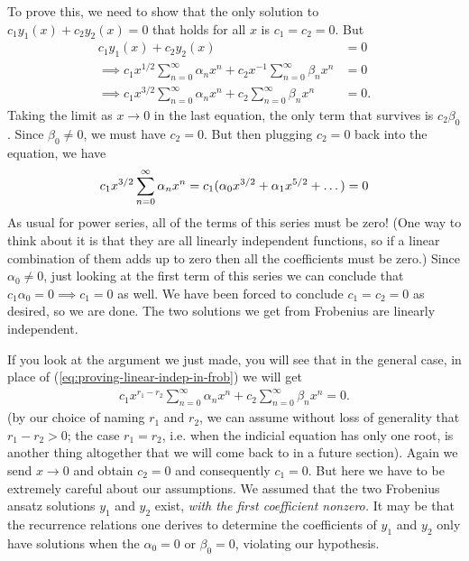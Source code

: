 \documentclass[11pt, letterpaper, oneside]{article}     %
\numberwithin{equation}{subsection}
\theoremstyle{definition}
\numberwithin{theorem}{section}
\theoremstyle{remark}
\begin{document}
\begin{enumerate}
  To prove this, we need to show that the only solution to $c_1y_1(x) + c_2y_2(x) = 0$ that holds for all $x$ is $c_1 = c_2 = 0$. But
  \begin{align}
    c_1 y_1(x) + c_2y_2(x) &= 0\\
    \implies c_1x^{1/2}\sum_{n=0}^\infty\alpha_nx^n + c_2x^{-1}\sum_{n=0}^\infty\beta_nx^n &= 0\\
    \implies c_1x^{3/2}\sum_{n=0}^\infty\alpha_nx^n + c_2\sum_{n=0}^\infty\beta_nx^n &= 0.\label{eq:proving-linear-indep-in-frob}
  \end{align}
  Taking the limit as $x\to 0$ in the last equation, the only term that survives is $c_2\beta_0$. Since $\beta_0 \neq 0$, we must have $c_2 = 0$. But then plugging $c_2 = 0$ back into the equation, we have
  \begin{equation}\\
    c_1x^{3/2}\sum_{n=0}^\infty\alpha_nx^n = c_1(\alpha_0x^{3/2} + \alpha_1x^{5/2} + \dots) = 0
  \end{equation}
  As usual for power series, all of the terms of this series must be zero! (One way to think about it is that they are all linearly independent functions, so if a linear combination of them adds up to zero then all the coefficients must be zero.) Since $\alpha_0 \neq 0$, just looking at the first term of this series we can conclude that $c_1\alpha_0 = 0\implies c_1 = 0$ as well. We have been forced to conclude $c_1 = c_2 = 0$ as desired, so we are done. The two solutions we get from Frobenius are linearly independent.

  If you look at the argument we just made, you will see that in the general case, in place of (\ref{eq:proving-linear-indep-in-frob}) we will get
  \begin{align}
    c_1x^{r_1 - r_2}\sum_{n=0}^\infty\alpha_nx^n + c_2\sum_{n=0}^\infty\beta_nx^n = 0.
  \end{align}
  (by our choice of naming $r_1$ and $r_2$, we can assume without loss of generality that $r_1 - r_2 > 0$; the case $r_1 = r_2$, i.e. when the indicial equation has only one root, is another thing altogether that we will come back to in a future section). Again we send $x\to 0$ and obtain $c_2 = 0$ and consequently $c_1 = 0$. But here we have to be extremely careful about our assumptions. We assumed that the two Frobenius ansatz solutions $y_1$ and $y_2$ exist, \emph{with the first coefficient nonzero.} It may be that the recurrence relations one derives to determine the coefficients of $y_1$ and $y_2$ only have solutions when the $\alpha_0 = 0$ or $\beta_0 = 0$, violating our hypothesis.


\end{enumerate}
\end{document}
